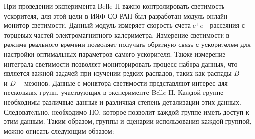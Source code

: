  При проведении эксперимента Belle II важно контролировать светимость ускорителя, для этой цели в ИЯФ СО РАН был разработан модуль онлайн монитор светимости. Данный модуль измеряет скорость счета $e^+e^-$ рассеяния с торцевых частей электромагнитного калориметра. Измерение светимости в режиме реального времени позволяет получать обратную связь с ускорителем для настройки оптимальных параметров самого ускорителя. Также измерение интеграла светимости позволяет мониторировать процесс набора данных, что является важной задачей при изучении редких распадов, таких как распады $B-$ и $D-$мезонов.
  Данные с монитора светимости представляют интерес для нескольких групп, участвующих в эксперименте Belle II. Каждой группе необходимы различные данные и различная степень детализации этих данных. Следовательно, необходимо ПО, которое позволит каждой группе иметь доступ к этим данным. Таким образом, группы и сценарии использования каждой группой, можно описать следующим образом:
